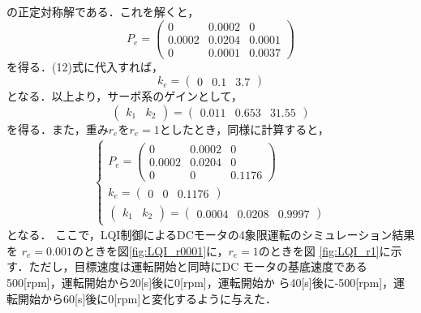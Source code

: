 \documentclass[a4paper,12pt]{jarticle}
\begin{document}
%
の正定対称解である．これを解くと，
%
\begin{equation}
 P_e =
  \begin{pmatrix}
   0      & 0.0002 & 0 \\
   0.0002 & 0.0204 & 0.0001 \\
   0      & 0.0001 & 0.0037
  \end{pmatrix}
\end{equation}
%
を得る．(12)式に代入すれば，
%
\begin{equation}
k_e =
  \begin{pmatrix}
   0 & 0.1 & 3.7
  \end{pmatrix}
\end{equation}
%
となる．以上より，サーボ系のゲインとして，
%
\begin{equation}
 \begin{pmatrix}
  k_1 & k_2
 \end{pmatrix}
 =
 \begin{pmatrix}
  0.011 & 0.653  & 31.55
 \end{pmatrix}
\end{equation}
%
を得る．また，重み$r_e$を$r_e=1$としたとき，同様に計算すると，
%
\begin{eqnarray}
 \begin{cases}
P_e=
  \begin{pmatrix}
   0      & 0.0002 & 0 \\
   0.0002 & 0.0204 & 0 \\
   0      &   0    & 0.1176 
 \end{pmatrix}
  \\
k_e=
\begin{pmatrix}
 0 & 0 & 0.1176
\end{pmatrix}
\\
\begin{pmatrix}
 k_1 & k_2
\end{pmatrix}
=
\begin{pmatrix}
 0.0004 & 0.0208 & 0.9997 
\end{pmatrix}
 
\end{cases}
\end{eqnarray}
%
となる．
ここで，LQI制御によるDCモータの4象限運転のシミュレーション結果を
$r_e=0.001$のときを図\ref{fig:LQI_r0001}に，$r_e=1$のときを図
\ref{fig:LQI_r1}に示す．ただし，目標速度は運転開始と同時にDC
モータの基底速度である500[rpm]，運転開始から20[s]後に0[rpm]，運転開始か
ら40[s]後に-500[rpm]，運転開始から60[s]後に0[rpm]と変化するように与えた．
%
\end{document}
